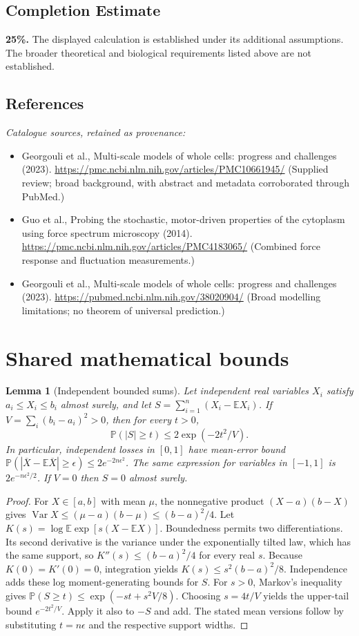 \documentclass[11pt]{article}
\newcommand{\E}{\mathbb E}
\newcommand{\Prob}{\mathbb P}
\DeclareMathOperator{\Var}{Var}
\providecommand{\E}{\mathbb E}
\providecommand{\Prob}{\mathbb P}
\providecommand{\Var}{\operatorname{Var}}
\newtheorem{sharedlemma}{Lemma}[section]
\begin{document}
\subsection{Completion Estimate}
\textbf{25\%.} The displayed calculation is established under its additional assumptions. The broader theoretical and biological requirements listed above are not established.
\subsection{References}
\noindent\emph{Catalogue sources, retained as provenance:}
\begin{itemize}
\item Georgouli et al., Multi-scale models of whole cells: progress and challenges (2023). \url{https://pmc.ncbi.nlm.nih.gov/articles/PMC10661945/} (Supplied review; broad background, with abstract and metadata corroborated through PubMed.)
\item Guo et al., Probing the stochastic, motor-driven properties of the cytoplasm using force spectrum microscopy (2014). \url{https://pmc.ncbi.nlm.nih.gov/articles/PMC4183065/} (Combined force response and fluctuation measurements.)
\item Georgouli et al., Multi-scale models of whole cells: progress and challenges (2023). \url{https://pubmed.ncbi.nlm.nih.gov/38020904/} (Broad modelling limitations; no theorem of universal prediction.)
\end{itemize}
\clearpage


\appendix
\section{Shared mathematical bounds}\label{app:bounds}
\begin{sharedlemma}[Independent bounded sums]\label{lem:bounded}
Let independent real variables $X_i$ satisfy $a_i\leq X_i\leq b_i$ almost surely,
and let $S=\sum_{i=1}^n(X_i-\E X_i)$. If
$V=\sum_i(b_i-a_i)^2>0$, then for every $t>0$,
\[
 \Prob(|S|\geq t)\leq 2\exp(-2t^2/V).
\]
In particular, independent losses in $[0,1]$ have mean-error bound
$\Prob(|\overline X-\E\overline X|\geq\epsilon)
\leq2e^{-2n\epsilon^2}$. The same expression for variables in $[-1,1]$
is $2e^{-n\epsilon^2/2}$. If $V=0$ then $S=0$ almost surely.
\end{sharedlemma}
\begin{proof}
For $X\in[a,b]$ with mean $\mu$, the nonnegative product
$(X-a)(b-X)$ gives
$\Var X\leq(\mu-a)(b-\mu)\leq(b-a)^2/4$.
Let $K(s)=\log\E\exp[s(X-\E X)]$.
Boundedness permits two differentiations. Its second derivative is the variance
under the exponentially tilted law, which has the same support, so
$K''(s)\leq(b-a)^2/4$ for every real $s$.
Because $K(0)=K'(0)=0$, integration yields
$K(s)\leq s^2(b-a)^2/8$.
Independence adds these log moment-generating bounds for $S$.
For $s>0$, Markov's inequality gives
$\Prob(S\geq t)\leq\exp(-st+s^2V/8)$.
Choosing $s=4t/V$ yields the upper-tail bound $e^{-2t^2/V}$.
Apply it also to $-S$ and add. The stated mean versions follow by substituting
$t=n\epsilon$ and the respective support widths.
\end{proof}
\end{document}
